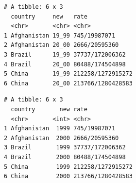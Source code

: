 \documentclass[
  11pt,
]{krantz}
\newenvironment{Shaded}{\begin{snugshade}}{\end{snugshade}}
\newcommand{\CommentTok}[1]{\textcolor[rgb]{0.37,0.37,0.37}{\textit{#1}}}
\newcommand{\DataTypeTok}[1]{\textcolor[rgb]{0.27,0.27,0.27}{#1}}
\newcommand{\KeywordTok}[1]{\textcolor[rgb]{0.27,0.27,0.27}{\textbf{#1}}}
\newcommand{\NormalTok}[1]{#1}
\newcommand{\OperatorTok}[1]{\textcolor[rgb]{0.43,0.43,0.43}{\textbf{#1}}}
\newcommand{\OtherTok}[1]{\textcolor[rgb]{0.37,0.37,0.37}{#1}}
\newcommand{\StringTok}[1]{\textcolor[rgb]{0.5,0.5,0.5}{#1}}
\begin{document}
\begin{Shaded}
\end{Shaded}

\begin{verbatim}
# A tibble: 6 x 3
  country     new   rate             
  <chr>       <chr> <chr>            
1 Afghanistan 19_99 745/19987071     
2 Afghanistan 20_00 2666/20595360    
3 Brazil      19_99 37737/172006362  
4 Brazil      20_00 80488/174504898  
5 China       19_99 212258/1272915272
6 China       20_00 213766/1280428583
\end{verbatim}

\begin{Shaded}
\end{Shaded}

\begin{verbatim}
# A tibble: 6 x 3
  country       new rate             
  <chr>       <int> <chr>            
1 Afghanistan  1999 745/19987071     
2 Afghanistan  2000 2666/20595360    
3 Brazil       1999 37737/172006362  
4 Brazil       2000 80488/174504898  
5 China        1999 212258/1272915272
6 China        2000 213766/1280428583
\end{verbatim}

\begin{Shaded}
\end{Shaded}
\end{document}
